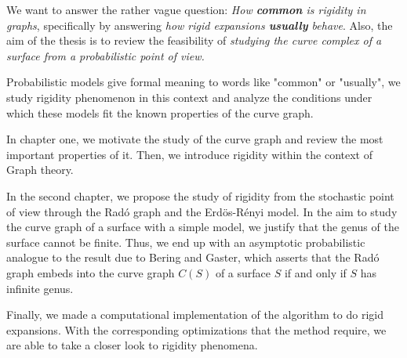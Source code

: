 We want to answer the rather vague question: \textit{How \textbf{common} is rigidity in graphs}, specifically by answering \textit{how rigid expansions \textbf{usually} behave}. Also, the aim of the thesis is to review the feasibility of \textit{studying the curve complex of a surface from a probabilistic point of view.}

Probabilistic models give formal meaning to words like "common" or "usually", we study rigidity phenomenon in this context and analyze the conditions under which these models fit the known properties of the curve graph.

In chapter one, we motivate the study of the curve graph and review the most important properties of it. Then, we introduce rigidity within the context of Graph theory.

In the second chapter, we propose the study of rigidity from the stochastic point of view through the Radó graph and the Erdös-Rényi model. In the aim to study the curve graph of a surface with a simple model, we justify that the genus of the surface cannot be finite. Thus, we end up with an asymptotic probabilistic analogue to the result due to Bering and Gaster, which asserts that the Radó graph embeds into the curve graph $C(S)$ of a surface $S$ if and only if $S$ has infinite genus.

Finally, we made a computational implementation of the algorithm to do rigid expansions. With the corresponding optimizations that the method require, we are able to take a closer look to rigidity phenomena.